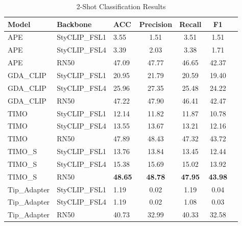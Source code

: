 \documentclass[conference,6pt]{IEEEtran}
\begin{document}
\begin{table}[H]
\centering
\tiny
\caption{2-Shot Classification Results}
\label{tab:results_2shot}
\begin{tabular}{@{}lll*{4}{S[table-format=2.2]}@{}}
\toprule
\textbf{Model} & \textbf{Backbone} & \textbf{ACC} & \textbf{Precision} & \textbf{Recall} & \textbf{F1} \\
\midrule
APE & StyCLIP\_FSL1 & 3.55 & 1.51 & 3.51 & 1.51 \\
APE & StyCLIP\_FSL4 & 3.39 & 2.03 & 3.38 & 1.71 \\
APE & RN50 & 47.09 & 47.77 & 46.65 & 42.37 \\
GDA\_CLIP & StyCLIP\_FSL1 & 20.95 & 21.79 & 20.59 & 19.40 \\
GDA\_CLIP & StyCLIP\_FSL4 & 25.96 & 27.35 & 25.48 & 24.22 \\
GDA\_CLIP & RN50 & 47.22 & 47.90 & 46.41 & 42.47 \\
TIMO & StyCLIP\_FSL1 & 12.14 & 11.82 & 11.87 & 10.78 \\
TIMO & StyCLIP\_FSL4 & 13.55 & 13.67 & 13.21 & 12.16 \\
TIMO & RN50 & 47.89 & 48.43 & 47.32 & 43.72 \\
TIMO\_S & StyCLIP\_FSL1 & 13.76 & 13.84 & 13.45 & 12.44 \\
TIMO\_S & StyCLIP\_FSL4 & 15.38 & 15.69 & 15.02 & 13.92 \\
TIMO\_S & RN50 & \textbf{48.65} & \textbf{48.78} & \textbf{47.95} & \textbf{43.98} \\
Tip\_Adapter & StyCLIP\_FSL1 & 1.19 & 0.02 & 1.19 & 0.04 \\
Tip\_Adapter & StyCLIP\_FSL4 & 1.19 & 0.02 & 1.08 & 0.03 \\
Tip\_Adapter & RN50 & 40.73 & 32.99 & 40.33 & 32.58 \\
\bottomrule
\end{tabular}
\end{table}
\end{document}
